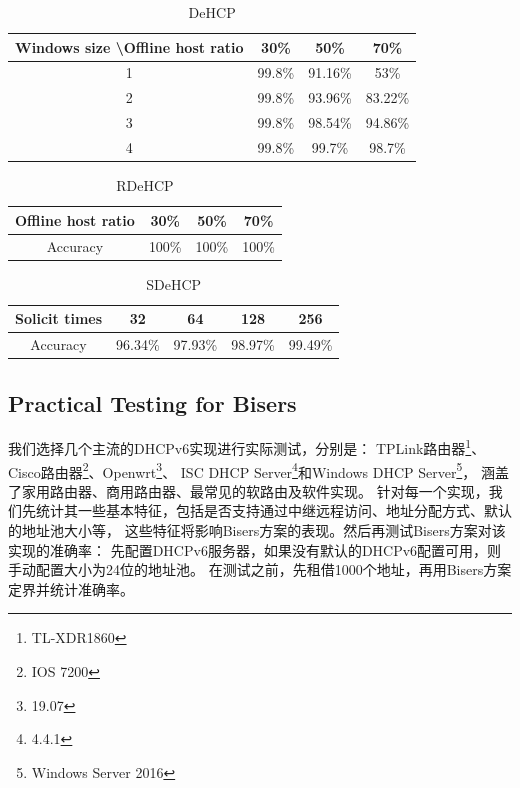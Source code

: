 \documentclass[UTF8]{article}
\begin{document}
\begin{table}[htbp]
  \caption{DeHCP}
  \label{tabDeHCP}
  \centering
  \begin{tabular}{|c|c|c|c|}
    \hline
    Windows size \textbackslash Offline host ratio & 30\% & 50\% & 70\% \\
    \hline
    1 & 99.8\% & 91.16\% & 53\% \\
    2 & 99.8\% & 93.96\% & 83.22\% \\
    3 & 99.8\% & 98.54\% & 94.86\% \\
    4 & 99.8\% & 99.7\% & 98.7\% \\
    \hline
  \end{tabular}
\end{table}

\begin{table}[htbp]
  \caption{RDeHCP}
  \label{tabRDeHCP}
  \centering
  \begin{tabular}{|c|c|c|c|}
    \hline
    Offline host ratio & 30\% & 50\% & 70\% \\
    \hline
    Accuracy & 100\% & 100\% & 100\% \\
    \hline
  \end{tabular}
\end{table}

\begin{table}[htbp]
  \caption{SDeHCP}
  \label{tabSDeHCP}
  \centering
  \begin{tabular}{|c|c|c|c|c|}
    \hline
    Solicit times & 32 & 64 & 128 & 256 \\
    \hline
    Accuracy & 96.34\% & 97.93\% & 98.97\% & 99.49\% \\
    \hline
  \end{tabular}
\end{table}

\subsection{Practical Testing for Bisers}

我们选择几个主流的DHCPv6实现进行实际测试，分别是：
TPLink路由器\footnote{TL-XDR1860}、Cisco路由器\footnote{IOS 7200}、Openwrt\footnote{19.07}、
ISC DHCP Server\footnote{4.4.1}和Windows DHCP Server\footnote{Windows Server 2016}，
涵盖了家用路由器、商用路由器、最常见的软路由及软件实现。
针对每一个实现，我们先统计其一些基本特征，包括是否支持通过中继远程访问、地址分配方式、默认的地址池大小等，
这些特征将影响Bisers方案的表现。然后再测试Bisers方案对该实现的准确率：
先配置DHCPv6服务器，如果没有默认的DHCPv6配置可用，则手动配置大小为24位的地址池。
在测试之前，先租借1000个地址，再用Bisers方案定界并统计准确率。
\end{document}
